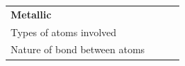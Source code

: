 \begin{enumerate}[noitemsep, label=\textbf{\arabic*}. ]
{{\begin{center}
\begin{tabular}[t]{|l|l|l|l|}
    
        \textbf{Metallic}%
     \tabularnewline\cline{1-1}\cline{2-2}\cline{3-3}\cline{4-4}
    
    
        Types of atoms involved &
    
    
         &
    
    
         &
    
    
     \tabularnewline\cline{1-1}\cline{2-2}\cline{3-3}\cline{4-4}
    
    
        Nature of bond between atoms &
    
    
         &
    
    
         &
    

\end{tabular}
\end{center}}}
\end{enumerate}
